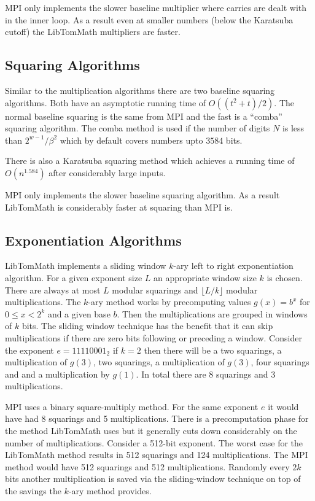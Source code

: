 \documentclass{article}
\begin{document}
MPI only implements the slower baseline multiplier where carries are dealt with in the inner loop.  As a result even at
smaller numbers (below the Karatsuba cutoff) the LibTomMath multipliers are faster.

\subsection{Squaring Algorithms}

Similar to the multiplication algorithms there are two baseline squaring algorithms.  Both have an asymptotic running
time of $O((t^2 + t)/2)$.  The normal baseline squaring is the same from MPI and the fast is a ``comba'' squaring
algorithm.  The comba method is used if the number of digits $N$ is less than $2^{w-1}/\beta^2$ which by default 
covers numbers upto $3584$ bits.  

There is also a Karatsuba squaring method which achieves a running time of $O(n^{1.584})$ after considerably large
inputs.

MPI only implements the slower baseline squaring algorithm.  As a result LibTomMath is considerably faster at squaring
than MPI is.

\subsection{Exponentiation Algorithms}

LibTomMath implements a sliding window $k$-ary left to right exponentiation algorithm.  For a given exponent size $L$ an
appropriate window size $k$ is chosen.  There are always at most $L$ modular squarings and $\lfloor L/k \rfloor$ modular
multiplications.   The $k$-ary method works by precomputing values $g(x) = b^x$ for $0 \le x < 2^k$ and a given base 
$b$.  Then the multiplications are grouped in windows of $k$ bits.  The sliding window technique has the benefit 
that it can skip multiplications if there are zero bits following or preceding a window.  Consider the exponent 
$e = 11110001_2$ if $k = 2$ then there will be a two squarings, a multiplication of $g(3)$, two squarings, a multiplication
of $g(3)$, four squarings and and a multiplication by $g(1)$.  In total there are 8 squarings and 3 multiplications.  

MPI uses a binary square-multiply method.  For the same exponent $e$ it would have had 8 squarings and 5 multiplications.  
There is a precomputation phase for the method LibTomMath uses but it generally cuts down considerably on the number
of multiplications.  Consider a 512-bit exponent.  The worst case for the LibTomMath method results in 512 squarings and 
124 multiplications.  The MPI method would have 512 squarings and 512 multiplications.  Randomly every $2k$ bits another 
multiplication is saved via the sliding-window technique on top of the savings the $k$-ary method provides.
\end{document}
